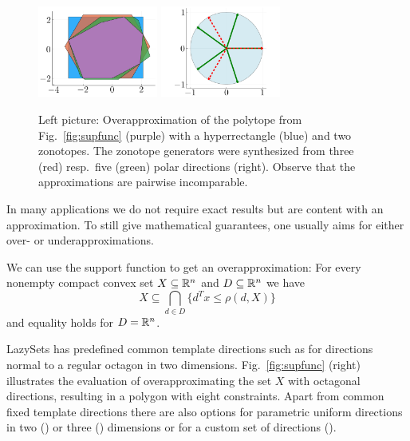 \begin{figure}
	\hfill
	\includegraphics[height=30mm]{img/overapproximate}
	\hfill
	\includegraphics[height=30mm]{img/polardirs}
	\hfill\
	\vspace*{1mm}
	\caption{Left picture: Overapproximation of the polytope from Fig.~\ref{fig:supfunc} (purple) with a hyperrectangle (blue) and two zonotopes. The zonotope generators were synthesized from three (red) resp.\ five (green) polar directions (right). Observe that the approximations are pairwise incomparable.}
	\label{fig:overapproximate}
\end{figure}

In many applications we do not require exact results but are content with an approximation. To still give mathematical guarantees, one usually aims for either over- or underapproximations.

We can use the support function to get an overapproximation: For every nonempty compact convex set $X \subseteq \mathbb{R}^n$ and $D \subseteq \mathbb{R}^n$ we have
\begin{equation*}
	X \subseteq \bigcap_{d \in D} \{d^T x \leq \rho(d, X)\}
\end{equation*}
and equality holds for $D = \mathbb{R}^n$.

\smallskip

LazySets has predefined common template directions such as  for directions normal to a regular octagon in two dimensions. Fig.~\ref{fig:supfunc} (right) illustrates the evaluation of overapproximating the set $X$ with octagonal directions, resulting in a polygon with eight constraints. Apart from common fixed template directions there are also options for parametric uniform directions in two () or three () dimensions or for a custom set of directions ().

